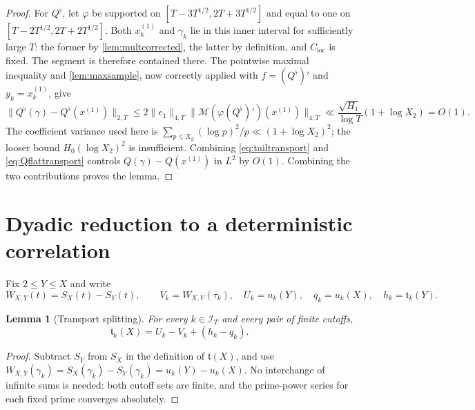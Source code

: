\documentclass[11pt,reqno]{amsart}
\numberwithin{equation}{section}
\newtheorem{lemma}[theorem]{Lemma}
\newcommand{\calI}{\mathcal I_T}
\newcommand{\Cloc}{C_{\mathrm{loc}}}
\begin{document}
\begin{proof}
For $Q^\flat$, let $\varphi$ be supported on
$[T-3T^{1/2},2T+3T^{1/2}]$ and equal to one on
$[T-2T^{1/2},2T+2T^{1/2}]$.  Both $x^{(1)}_k$ and
$\gamma_k$ lie in this inner interval for sufficiently large $T$:
the former by \cref{lem:multcorrected}, the latter by definition,
and $\Cloc$ is fixed. The segment is therefore contained there.
The pointwise maximal inequality and \cref{lem:maxsample},
now correctly applied with $f=(Q^\flat)'$ and $y_k=x_k^{(1)}$,
give
\begin{equation}\label{eq:Qflattransport}
\|Q^\flat(\gamma)-Q^\flat(x^{(1)})\|_{2,T}
\le2\|e_1\|_{4,T}
\bigl\|\mathcal M(\varphi(Q^\flat)')(x^{(1)})\bigr\|_{4,T}
\ll\frac{\sqrt{H_1}}{\log T}(1+\log X_2)=O(1).
\end{equation}
The coefficient variance used here is
$\sum_{p\le X_2}(\log p)^2/p\ll(1+\log X_2)^2$;
the looser bound $H_0(\log X_2)^2$ is insufficient.
Combining \eqref{eq:tailtransport} and \eqref{eq:Qflattransport}
controls $Q(\gamma)-Q(x^{(1)})$ in $L^2$ by $O(1)$.
Combining the two contributions proves the lemma.
\end{proof}


\section{Dyadic reduction to a deterministic correlation}\label{sec:reduction}
Fix $2\le Y\le X$ and write
\begin{equation}\label{eq:W}
W_{X,Y}(t)=S_X(t)-S_Y(t),\qquad
V_k=W_{X,Y}(\tau_k),\quad U_k=u_k(Y),\quad q_k=u_k(X),\quad h_k=\mathfrak t_k(Y).
\end{equation}
\begin{lemma}[Transport splitting]\label{lem:splitting}
For every $k\in\calI$ and every pair of finite cutoffs,
\begin{equation}\label{eq:transport_split}
\mathfrak t_k(X)=U_k-V_k+(h_k-q_k).
\end{equation}
\end{lemma}
\begin{proof}
Subtract $S_Y$ from $S_X$ in the definition of $\mathfrak t(X)$, and use
$W_{X,Y}(\gamma_k)=S_X(\gamma_k)-S_Y(\gamma_k)=u_k(Y)-u_k(X)$. No interchange of infinite sums is needed: both cutoff sets are finite, and the prime-power series for each fixed prime converges absolutely.
\end{proof}
\end{document}
